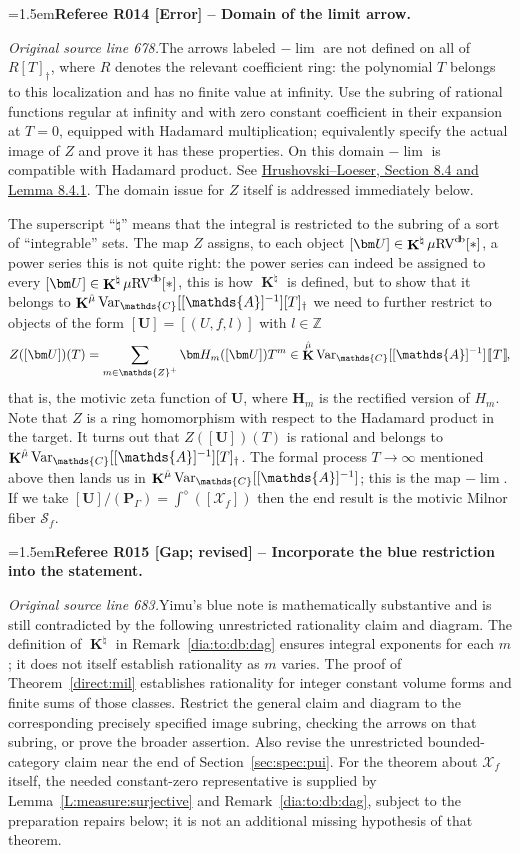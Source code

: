 \documentclass[12pt]{amsart}
\newcommand{\RefereeRemark}[4]{%
  \par\medskip\begingroup\normalfont\small\color{RefereePurple}%
  \emergencystretch=1.5em\noindent\textbf{Referee R#1 [#2] -- #3.}\par\nobreak\noindent #4\par
  \endgroup\medskip
}
\newcommand{\yimu}[1]{{\color{blue}#1}}
\theoremstyle{plain}
\theoremstyle{definition}
\theoremstyle{remark}
\numberwithin{equation}{section}
\theoremstyle{plain}
\newcommand{\RV}{\textup{RV}}
\newcommand{\Z}{\mathds{Z}}
\newcommand{\A}{\mathds{A}}
\newcommand{\C}{\mathds{C}}
\newcommand{\0}{\emptyset}
\newcommand{\dbra}[1]{%
  \,[\mkern-6.8mu[\, #1 \,]\mkern-6.8mu]}
\newcommand{\mdl}[1]{\mathcal{#1}}  %
\newcommand{\limplies}{\rightarrow}
\newcommand{\mgRV}{{\mu}{\RV}}
\DeclareMathOperator{\ggk}{\mathbf{K}}
\DeclareMathOperator{\db}{d \! b}
\newcommand{\var}{\textup{Var}}
\newcommand{\gmv}{\ggk^{\hat \mu}\var_{\C}}
\begin{document}
\RefereeRemark{014}{Error}{Domain of the limit arrow}{%
\textit{Original source line 678.}\quad The arrows labeled $-\lim$ are not defined on all of $R[T]_{\dag}$, where $R$ denotes the relevant coefficient ring: the polynomial $T$ belongs to this localization and has no finite value at infinity. Use the subring of rational functions regular at infinity and with zero constant coefficient in their expansion at $T=0$, equipped with Hadamard multiplication; equivalently specify the actual image of $Z$ and prove it has these properties. On this domain $-\lim$ is compatible with Hadamard product. See \href{https://arxiv.org/pdf/1111.1954}{Hrushovski--Loeser, Section 8.4 and Lemma 8.4.1}. The domain issue for $Z$ itself is addressed immediately below.
}
The superscript ``$\natural$'' means that the integral is restricted to the subring of a sort of ``integrable'' sets. The map $Z$ assigns, to each object $[\bm U] \in \ggk^\natural \mgRV^{\db}[*]$,  a power series \yimu{this is not quite right: the power series can indeed be assigned to every $[\bm U] \in \ggk^\natural \mgRV^{\db}[*]$, this is how $\ggk^\natural$ is defined, but to show that it belongs to  $\gmv[[\A]^{-1}][T]_{\dag}$ we need to further restrict to objects of the form $[\bm U] = [(U, f, l)]$ with $l \in \Z$}
\[
Z([\bm U])(T) = \sum_{m \in \Z^+} \bm H_m([\bm U]) T^m \in \ggk^{\hat \mu} \var_{\C}[[\A]^{-1}] \dbra T,
\]
that is, the motivic zeta function of $\bm U$, where $\bm H_m$ is the rectified version of $H_m$. Note that $Z$ is a ring homomorphism with respect to the Hadamard product in the target. It turns out that $Z([\bm U])(T)$ is rational and belongs to $\gmv[[\A]^{-1}][T]_{\dag}$. The formal process $T \limplies \infty$ mentioned above then lands us in $\gmv[[\A]^{-1}]$; this is the map $-\lim$. If we take $[\bm U] / (\bm P_\Gamma) = \int^{\diamond}([\mdl X_f])$ then the end result is the motivic Milnor fiber $\mathscr S_{f}$.

\RefereeRemark{015}{Gap; revised}{Incorporate the blue restriction into the statement}{%
\textit{Original source line 683.}\quad Yimu's blue note is mathematically substantive and is still contradicted by the following unrestricted rationality claim and diagram. The definition of $\ggk^{\natural}$ in Remark~\ref{dia:to:db:dag} ensures integral exponents for each $m$; it does not itself establish rationality as $m$ varies. The proof of Theorem~\ref{direct:mil} establishes rationality for integer constant volume forms and finite sums of those classes. Restrict the general claim and diagram to the corresponding precisely specified image subring, checking the arrows on that subring, or prove the broader assertion. Also revise the unrestricted bounded-category claim near the end of Section~\ref{sec:spec:pui}. For the theorem about $\mdl X_f$ itself, the needed constant-zero representative is supplied by Lemma~\ref{L:measure:surjective} and Remark~\ref{dia:to:db:dag}, subject to the preparation repairs below; it is not an additional missing hypothesis of that theorem.
}
\end{document}
